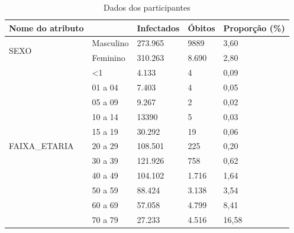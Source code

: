 \begin{longtable}{lllll}
\caption{Dados dos participantes}
\label{tab_dados_perfil}\\ \hline
Nome do atributo                                              &               & Infectados  & Óbitos & Proporção (\%) \\ \hline
\endfirsthead
%
\endhead
%
\multirow{2}{*}{SEXO}                                          & Masculino     & 273.965 & 9889         & 3,60           \\
                                                               & Feminino      & 310.263 & 8.690         & 2,80           \\ \hline
\multirow{12}{*}{FAIXA\_ETARIA}                                 & \textless{}1  & 4.133   & 4            & 0,09           \\
                                                               & 01 a 04       & 7.403   & 4            & 0,05           \\
                                                               & 05 a 09       & 9.267   & 2            & 0,02           \\
                                                               & 10 a 14       & 13390  & 5            & 0,03           \\
                                                               & 15 a 19       & 30.292  & 19           & 0,06           \\
                                                               & 20 a 29       & 108.501 & 225           & 0,20           \\
                                                               & 30 a 39       & 121.926 & 758          & 0,62           \\
                                                               & 40 a 49       & 104.102 & 1.716          & 1,64           \\
                                                               & 50 a 59       & 88.424  & 3.138         & 3,54           \\
                                                               & 60 a 69       & 57.058  & 4.799         & 8,41           \\
                                                               & 70 a 79       & 27.233  &   4.516       & 16,58          \\

\end{longtable}
